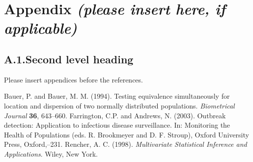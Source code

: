 \documentclass[bimj,fleqn]{w-art}
\theoremstyle{plain}
\theoremstyle{definition}
\begin{document}


\section*{Appendix {\it(please insert here, if applicable)}}

\subsection*{A.1.\enspace Second level heading}

Please insert appendices before the references.

\begin{thebibliography}{10}
Bauer, P. and  Bauer, M. M. (1994). Testing equivalence simultaneously for location and  dispersion of two normally distributed populations.  \textit{Biometrical  Journal} \textbf{36}, 643--660.
Farrington, C.P. and Andrews, N. (2003). Outbreak detection:
Application to infectious disease surveillance. In: Monitoring the Health of Populations (eds. R. Brookmeyer and D. F. Stroup), Oxford University Press, Oxford,--231.
Rencher, A. C. (1998).  \textit{Multivariate Statistical Inference and Applications}. Wiley, New  York. 
\end{thebibliography}
\newpage
\phantom{aaaa}
\end{document}
